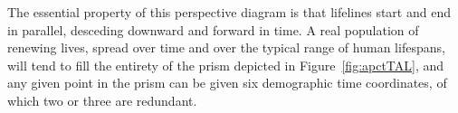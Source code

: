 \documentclass[12pt,oneside,a4paper]{article} %
\theoremstyle{definition}
\begin{document}
The essential property of this perspective diagram is that lifelines
start and end in parallel, desceding downward and forward in time. A real
population of renewing lives, spread over time and over the typical range of
human lifespans, will tend to fill the entirety of the prism depicted in
Figure~\ref{fig:apctTAL}, and any given point in the prism can be given six
demographic time coordinates, of which two or three are redundant.



\end{document}
